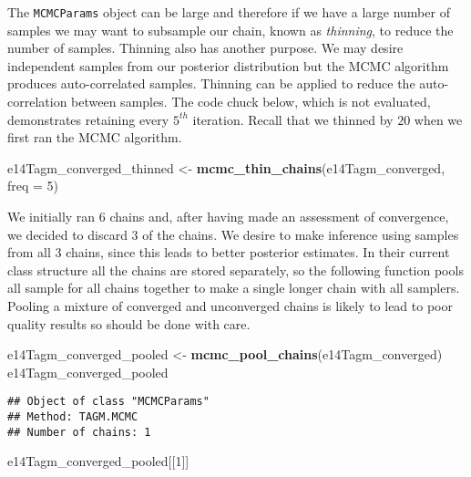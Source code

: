\documentclass[]{article}
\newenvironment{Shaded}{\begin{snugshade}}{\end{snugshade}}
\newcommand{\KeywordTok}[1]{\textcolor[rgb]{0.13,0.29,0.53}{\textbf{{#1}}}}
\newcommand{\DataTypeTok}[1]{\textcolor[rgb]{0.13,0.29,0.53}{{#1}}}
\newcommand{\DecValTok}[1]{\textcolor[rgb]{0.00,0.00,0.81}{{#1}}}
\newcommand{\StringTok}[1]{\textcolor[rgb]{0.31,0.60,0.02}{{#1}}}
\newcommand{\NormalTok}[1]{{#1}}
\begin{document}
The \texttt{MCMCParams} object can be large and therefore if we have a
large number of samples we may want to subsample our chain, known as
\emph{thinning}, to reduce the number of samples. Thinning also has
another purpose. We may desire independent samples from our posterior
distribution but the MCMC algorithm produces auto-correlated samples.
Thinning can be applied to reduce the auto-correlation between samples.
The code chuck below, which is not evaluated, demonstrates retaining
every \(5^{th}\) iteration. Recall that we thinned by \(20\) when we
first ran the MCMC algorithm.

\begin{Shaded}
\begin{Highlighting}[]
\NormalTok{e14Tagm_converged_thinned <-}\StringTok{ }\KeywordTok{mcmc_thin_chains}\NormalTok{(e14Tagm_converged, }\DataTypeTok{freq  =} \DecValTok{5}\NormalTok{)}
\end{Highlighting}
\end{Shaded}

We initially ran \(6\) chains and, after having made an assessment of
convergence, we decided to discard \(3\) of the chains. We desire to
make inference using samples from all \(3\) chains, since this leads to
better posterior estimates. In their current class structure all the
chains are stored separately, so the following function pools all sample
for all chains together to make a single longer chain with all samplers.
Pooling a mixture of converged and unconverged chains is likely to lead
to poor quality results so should be done with care.

\begin{Shaded}
\begin{Highlighting}[]
\NormalTok{e14Tagm_converged_pooled <-}\StringTok{ }\KeywordTok{mcmc_pool_chains}\NormalTok{(e14Tagm_converged)}
\NormalTok{e14Tagm_converged_pooled}
\end{Highlighting}
\end{Shaded}

\begin{verbatim}
## Object of class "MCMCParams"
## Method: TAGM.MCMC 
## Number of chains: 1
\end{verbatim}

\begin{Shaded}
\begin{Highlighting}[]
\NormalTok{e14Tagm_converged_pooled[[}\DecValTok{1}\NormalTok{]]}
\end{Highlighting}
\end{Shaded}
\end{document}
